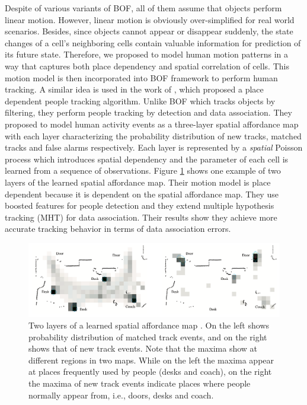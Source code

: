 Despite of various variants of BOF, all of them assume that objects perform linear motion. However, linear motion is obviously over-simplified for real world scenarios. Besides, since objects cannot appear or disappear suddenly, the state changes of a cell's neighboring cells contain valuable information for prediction of its future state. Therefore, we proposed to model human motion patterns in a way that captures both place dependency and spatial correlation of cells. This motion model is then incorporated into BOF framework to perform human tracking. A similar idea is used in the work of \citet{luber2011place}, which proposed a place dependent people tracking algorithm. Unlike BOF which tracks objects by filtering, they perform people tracking by detection and data association. They proposed to model human activity events as a three-layer spatial affordance map with each layer characterizing the probability distribution of new tracks, matched tracks and false alarms respectively. Each layer is represented by a \textit{spatial} Poisson process which introduces spatial dependency and the parameter of each cell is learned from a sequence of observations. Figure \ref{fig:affordance} shows one example of two layers of the learned spatial affordance map. Their motion model is place dependent because it is dependent on the spatial affordance map. They use boosted features for people detection \citep{arras2007using} and they extend multiple hypothesis tracking (MHT) for data association. Their results show they achieve more accurate tracking behavior in terms of data association errors. 

\begin{figure}[H]
  \centering
    \includegraphics[width=\textwidth]{figures/affordance_map.png}
    \caption[Two layers of a spatial affordance map.]{Two layers of a learned spatial affordance map \citep{luber2011place}. On the left shows probability distribution of matched track events, and on the right shows that of new track events. Note that the maxima show at different regions in two maps. While on the left the maxima appear at places frequently used by people (desks and coach), on the right the maxima of new track events indicate places where people normally appear from, i.e., doors, desks and coach.}
    \label{fig:affordance}
\end{figure}

